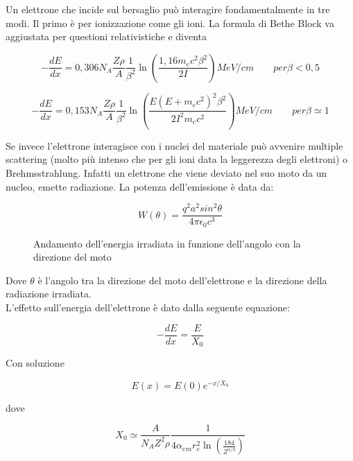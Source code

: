 Un elettrone che incide sul bersaglio può interagire fondamentalmente in tre modi. Il primo è per ionizzazione come gli ioni. La formula di Bethe Block va aggiustata per questioni relativistiche e diventa

\begin{equation}
-\frac{dE}{dx}=0,306 N_A\frac{Z\rho}{A}\frac{1}{\beta^2}\ln(\frac{1,16m_ec^2\beta^2}{2I}) MeV/cm\qquad per \beta<0,5
\end{equation}

\begin{equation}
-\frac{dE}{dx}=0,153 N_A\frac{Z\rho}{A}\frac{1}{\beta^2}\ln(\frac{E(E+m_ec^2)^2\beta^2}{2I^2m_ec^2}) MeV/cm \qquad per \beta\simeq 1
\end{equation}

Se invece l'elettrone interagisce con i nuclei del materiale può avvenire multiple scattering (molto più intenso che per gli ioni data la leggerezza degli elettroni) o Brehmsstrahlung. 
Infatti un elettrone che viene deviato nel suo moto da un nucleo, emette radiazione. La potenza dell'emissione è data da:

\begin{equation}
W(\theta)=\frac{q^2a^2sin^2\theta}{4\pi\epsilon_{0}c^3}
\end{equation}

\begin{figure} []
\centering
		\caption{Andamento dell'energia irradiata in funzione dell'angolo con la direzione del moto}
         \label{brehmtheta}
\end{figure}

Dove $\theta$ è l'angolo tra la direzione del moto dell'elettrone e la direzione della radiazione irradiata.\\

L'effetto sull'energia dell'elettrone è dato dalla seguente equazione:

\begin{equation}
-\frac{dE}{dx}=\frac{E}{X_0}
\end{equation}

Con soluzione

\begin{equation}
E(x)=E(0)e^{-x/X_0}
\end{equation}

dove 

\begin{equation}
X_0\simeq\frac{A}{N_A Z^2 \rho}\frac{1}{4 \alpha_{em}r_e^2 \ln(\frac{184}{Z^{1/3}})}
\end{equation}

